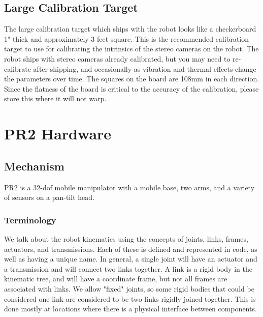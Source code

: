 \section{Large Calibration Target}
The large calibration target which ships with the robot looks like a
checkerboard 1" thick and approximately 3 feet square.  This is the
recommended calibration target to use for calibrating the intrinsics of the
stereo cameras on the robot.  The robot ships with stereo cameras already
calibrated, but you may need to re-calibrate after shipping, and occasionally as vibration and
thermal effects change the parameters over time.  The squares on the board are 108mm in each direction.
Since the flatness of the board is critical to the accuracy of the calibration, please store this where it will not warp.

\chapter{PR2 Hardware}
\section{Mechanism}
PR2 is a 32-dof mobile manipulator with a mobile base, two arms, and a variety
of sensors on a pan-tilt head.

\subsection{Terminology}
We talk about the robot kinematics using the concepts of joints, links, frames,
actuators, and transmissions.  Each of these is defined and represented in code,
as well as having a unique name.  In general, a single joint will have an
actuator and a transmission and will connect two links together.  A link is a
rigid body in the kinematic tree, and will have a coordinate frame, but not all
frames are associated with links.  We allow "fixed" joints, so some rigid bodies
that could be considered one link are considered to be two links rigidly joined
together.  This is done mostly at locations where there is a physical interface
between components.

